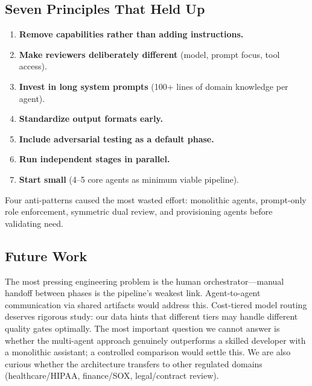 \documentclass[a4paper,USenglish,cleveref,autoref]{lipics-v2021}
\begin{document}
\subsection{Seven Principles That Held Up}

\begin{enumerate}
    \item \textbf{Remove capabilities rather than adding instructions.}
    \item \textbf{Make reviewers deliberately different} (model, prompt focus, tool access).
    \item \textbf{Invest in long system prompts} (100+ lines of domain knowledge per agent).
    \item \textbf{Standardize output formats early.}
    \item \textbf{Include adversarial testing as a default phase.}
    \item \textbf{Run independent stages in parallel.}
    \item \textbf{Start small} (4--5 core agents as minimum viable pipeline).
\end{enumerate}

Four anti-patterns caused the most wasted effort: monolithic agents, prompt-only role enforcement, symmetric dual review, and provisioning agents before validating need.

\subsection{Future Work}

The most pressing engineering problem is the human orchestrator---manual handoff between phases is the pipeline's weakest link. Agent-to-agent communication via shared artifacts would address this. Cost-tiered model routing deserves rigorous study: our data hints that different tiers may handle different quality gates optimally. The most important question we cannot answer is whether the multi-agent approach genuinely outperforms a skilled developer with a monolithic assistant; a controlled comparison would settle this. We are also curious whether the architecture transfers to other regulated domains (healthcare/HIPAA, finance/SOX, legal/contract review).



\end{document}
